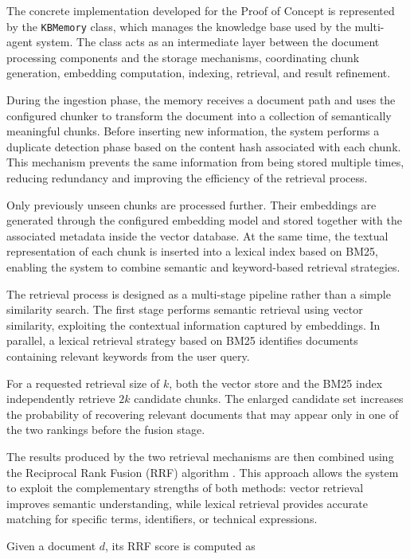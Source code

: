 The concrete implementation developed for the Proof of Concept is represented by the \texttt{KBMemory} class, which manages the knowledge base used by the multi-agent system. The class acts as an intermediate layer between the document processing components and the storage mechanisms, coordinating chunk generation, embedding computation, indexing, retrieval, and result refinement.

During the ingestion phase, the memory receives a document path and uses the configured chunker to transform the document into a collection of semantically meaningful chunks. Before inserting new information, the system performs a duplicate detection phase based on the content hash associated with each chunk. This mechanism prevents the same information from being stored multiple times, reducing redundancy and improving the efficiency of the retrieval process.

Only previously unseen chunks are processed further. Their embeddings are generated through the configured embedding model and stored together with the associated metadata inside the vector database. At the same time, the textual representation of each chunk is inserted into a lexical index based on BM25, enabling the system to combine semantic and keyword-based retrieval strategies.

The retrieval process is designed as a multi-stage pipeline rather than a simple similarity search. The first stage performs semantic retrieval using vector similarity, exploiting the contextual information captured by embeddings. In parallel, a lexical retrieval strategy based on BM25 identifies documents containing relevant keywords from the user query. 

For a requested retrieval size of \(k\), both the vector store and the BM25 index independently retrieve \(2k\) candidate chunks. The enlarged candidate set increases the probability of recovering relevant documents that may appear only in one of the two rankings before the fusion stage.

The results produced by the two retrieval mechanisms are then combined using the Reciprocal Rank Fusion (RRF) algorithm \cite{cormack2009reciprocal}. This approach allows the system to exploit the complementary strengths of both methods: vector retrieval improves semantic understanding, while lexical retrieval provides accurate matching for specific terms, identifiers, or technical expressions.


Given a document \(d\), its RRF score is computed as

